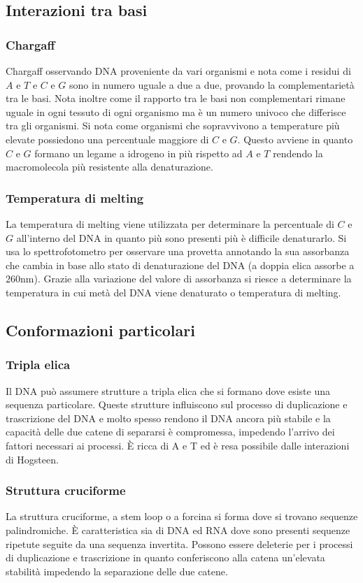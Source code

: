 \subsection{Interazioni tra basi}
\subsubsection{Chargaff}
Chargaff osservando DNA proveniente da vari organismi e nota come i residui di $A$ e $T$ e $C$ e $G$ sono in numero uguale a due a due, provando la complementariet\`a tra le basi. Nota
inoltre come il rapporto tra le basi non complementari rimane uguale in ogni tessuto di ogni organismo ma \`e un numero univoco che differisce tra gli organismi. Si nota come organismi
che sopravvivono a temperature pi\`u elevate possiedono una percentuale maggiore di $C$ e $G$. Questo avviene in quanto $C$ e $G$ formano un legame a idrogeno in pi\`u rispetto ad 
$A$ e $T$ rendendo la macromolecola pi\`u resistente alla denaturazione. 
\subsubsection{Temperatura di melting}
La temperatura di melting viene utilizzata per determinare la percentuale di $C$ e $G$ all'interno del DNA in quanto pi\`u sono presenti pi\`u \`e difficile denaturarlo. Si usa lo 
spettrofotometro per osservare una provetta annotando la sua assorbanza che cambia in base allo stato di denaturazione del DNA (a doppia elica assorbe a $260\si{\nano\metre}$). Grazie
alla variazione del valore di assorbanza si riesce a determinare la temperatura in cui met\`a del DNA viene denaturato o temperatura di melting. 
\subsection{Conformazioni particolari}
\subsubsection{Tripla elica}
Il DNA pu\`o assumere strutture a tripla elica che si formano dove esiste una sequenza particolare. Queste strutture influiscono sul processo di duplicazione e trascrizione del DNA e 
molto spesso rendono il DNA ancora pi\`u stabile e la capacit\`a delle due catene di separarsi \`e compromessa, impedendo l'arrivo dei fattori necessari ai processi. \`E ricca di A e T  
ed \`e resa possibile dalle interazioni di Hogsteen. 
\subsubsection{Struttura cruciforme}
La struttura cruciforme, a stem loop o a forcina si forma dove si trovano sequenze palindromiche. \`E caratteristica sia di DNA ed RNA dove sono presenti sequenze ripetute seguite
da una sequenza invertita. Possono essere deleterie per i processi di duplicazione e trascrizione in quanto conferiscono alla catena un'elevata stabilit\`a impedendo la separazione delle
due catene. 
